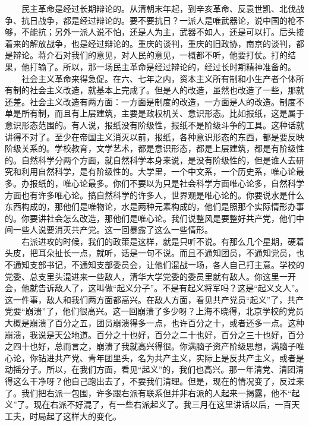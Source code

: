 \documentclass[cn,11pt,chinese]{elegantbook}
\begin{document}
　　民主革命是经过长期辩论的。从清朝末年起，到辛亥革命、反袁世凯、北伐战争、抗日战争，都是经过辩论的。要不要抗日？一派人是唯武器论，说中国的枪不够，不能抗；另外一派人说不怕，还是人为主，武器不如人，还是可以打。后头接着来的解放战争，也是经过辩论的。重庆的谈判，重庆的旧政协，南京的谈判，都是辩论。蒋介石对我们的意见，对人民的意见，一概都不听，他要打仗。打的结果，他打输了。所以，那一场民主革命是经过辩论的，经过长时期精神准备的。\\
　　社会主义革命来得急促。在六、七年之内，资本主义所有制和小生产者个体所有制的社会主义改造，就基本上完成了。但是人的改造，虽然也改造了一些，那就还差。社会主义改造有两方面：一方面是制度的改造，一方面是人的改造。制度不单是所有制，而且有上层建筑，主要是政权机关、意识形态。比如报纸，这是属于意识形态范围的。有人说，报纸没有阶级性，报纸不是阶级斗争的工具。这种话就讲得不对了。至少在帝国主义消灭以前，报纸，各种意识形态的东西，都是要反映阶级关系的。学校教育，文学艺术，都是意识形态，都是上层建筑，都是有阶级性的。自然科学分两个方面，就自然科学本身来说，是没有阶级性的，但是谁人去研究和利用自然科学，是有阶级性的。大学里，一个中文系，一个历史系，唯心论最多。办报纸的，唯心论最多。你们不要以为只是社会科学方面唯心论多，自然科学方面也有许多唯心论。搞自然科学的许多人，世界观是唯心论的。你要说水是什么东西构成的，那他们是唯物论，水是两种元素构成的，他们是照那个实际情形办事的。你要讲社会怎么改造，那他们是唯心论。我们说整风是要整好共产党，他们中间一些人说要消灭共产党。这一回暴露了这么一些情形。\\
　　右派进攻的时候，我们的政策是这样，就是只听不说。有那么几个星期，硬着头皮，把耳朵扯长一点，就听，话是一句不说。而且不通知团员，不通知党员，也不通知支部书记，不通知支部委员会，让他们混战一场，各人自己打主意。学校的党委、总支里头混进来一些敌人，清华大学党委的委员里就有敌人。你这里一开会，他就告诉敌人了，这叫做“起义分子”。不是有起义将军吗？这是“起义文人”。这一件事，敌人和我们两方面都高兴。在敌人方面，看见共产党员“起义”了，共产党要“崩溃”了，他们很高兴。这一回崩溃了多少呀？上海不晓得，北京学校的党员大概是崩溃了百分之五，团员崩溃得多一点，也许百分之十，或者还多一点。这种崩溃，我说是天公地道。百分之十也好，百分之二十也好，百分之三十也好，百分之四十也好，总而言之，崩溃了我就高兴得很。你满脑子资产阶级思想，满脑子唯心论，你钻进共产党、青年团里头，名为共产主义，实际上是反共产主义，或者是动摇分子。所以，在我们方面，看见“起义”的，我们也高兴。那一年清党、清团清得这么干净呀？他自己跑出去了，不要我们清理。但是，现在的情况变了，反过来了。我们把右派一包围，许多跟右派有联系但并非右派的人起来一揭露，他不“起义”了。现在右派不好混了，有一些右派起义了。我三月在这里讲话以后，一百天工夫，时局起了这样大的变化。\\
\end{document}
